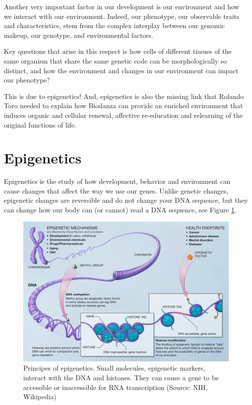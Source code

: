 \documentclass[
  11pt,
]{book}
\begin{document}
Another very important factor in our development is our environment and how we interact with our environment.
Indeed, our phenotype, our observable traits and characteristics, stem from the complex interplay between our genomic makeup, our genotype, and environmental factors.

Key questions that arise in this respect is how cells of different tissues of the same organism that share the same genetic code can be morphologically so distinct, and how the environment and changes in our environment can impact our phenotype?

This is due to epigenetics! And, epigenetics is also the missing link that Rolando Toro needed to explain how Biodanza can provide an enriched environment that induces organic and cellular renewal, affective re-education and relearning of the original functions of life.

\hypertarget{epigenetics}{%
\section{Epigenetics}\label{epigenetics}}

Epigenetics is the study of how development, behavior and environment can cause changes that affect the way we use our genes. Unlike genetic changes, epigenetic changes are reversible and do not change your DNA sequence, but they can change how our body can (or cannot) read a DNA sequence, see Figure \ref{fig:epigenetics}.

\begin{figure}

{\centering \includegraphics[width=1\linewidth]{./figs/Epigenetic_mechanisms} 

}

\caption{Principes of epigenetics. Small molecules, epigenetic markers, interact with the DNA and histones. They can cause a gene to be accessible or inaccessible for RNA transcription (Source: NIH, Wikipedia)}\label{fig:epigenetics}
\end{figure}
\end{document}
